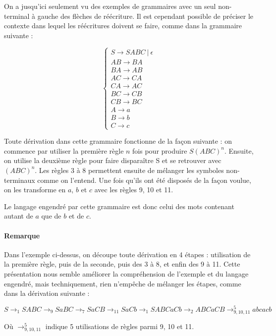 \begin{example}
\label{ggramabcn}
On a jusqu'ici seulement vu des exemples de grammaires avec un seul non-terminal à gauche des flèches de réécriture. Il est cependant possible de préciser le contexte dans lequel les réécritures doivent se faire, comme dans la grammaire suivante :

\[
\begin{cases}
S \rightarrow SABC~|~\epsilon \\
AB \rightarrow BA \\
BA \rightarrow AB \\
AC \rightarrow CA \\
CA \rightarrow AC \\
BC \rightarrow CB \\
CB \rightarrow BC \\
A \rightarrow a \\
B \rightarrow b \\
C \rightarrow c
\end{cases}
\]

Toute dérivation dans cette grammaire fonctionne de la façon suivante : on commence par utiliser la première règle $n$ fois pour produire $S(ABC)^n$. Ensuite, on utilise la deuxième règle pour faire disparaître S et se retrouver avec $(ABC)^n$. Les règles 3 à 8 permettent ensuite de mélanger les symboles non-terminaux comme on l'entend. Une fois qu'ils ont été disposés de la façon voulue, on les transforme en $a$, $b$ et $c$ avec les règles 9, 10 et 11.

Le langage engendré par cette grammaire est donc celui des mots contenant autant de $a$ que de $b$ et de $c$.
\end{example}

\paragraph{Remarque} Dans l'exemple ci-dessus, on découpe toute dérivation en 4 étapes : utilisation de la première règle, puis de la seconde, puis des 3 à 8, et enfin des 9 à 11. Cette présentation nous semble améliorer la compréhension de l'exemple et du langage engendré, mais techniquement, rien n'empêche de mélanger les étapes, comme dans la dérivation suivante :

 \[
 S \rightarrow_1 SABC \rightarrow_9 SaBC \rightarrow_7 SaCB \rightarrow_{11} SaCb \rightarrow_1 SABCaCb \rightarrow_2 ABCaCB \rightarrow_{9,10,11}^5 abcacb 
 \]

 Où $\rightarrow_{9,10,11}^5$ indique 5 utilisations de règles parmi 9, 10 et 11.
 
